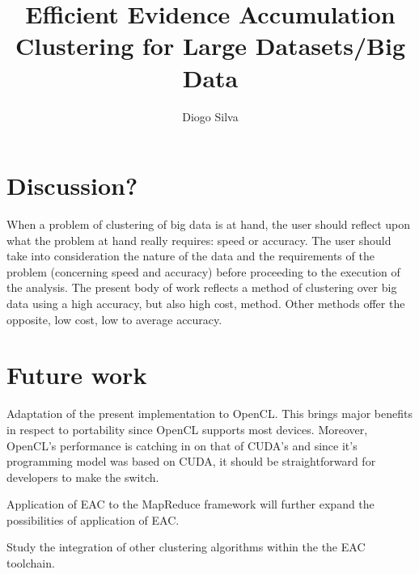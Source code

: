 \documentclass[10pt,a4paper,final]{article}
\author{Diogo Silva}
\title{Efficient Evidence Accumulation Clustering for Large Datasets/Big Data}
\begin{document}
\onehalfspacing %



\tableofcontents

\printglossary[type=\acronymtype,title=Abbreviations]









\section{Discussion?}

When a problem of clustering of big data is at hand, the user should reflect upon what the problem at hand really requires: speed or accuracy. The user should take into consideration the nature of the data and the requirements of the problem (concerning speed and accuracy) before proceeding to the execution of the analysis. The present body of work reflects a method of clustering over big data using a high accuracy, but also high cost, method. Other methods offer the opposite, low cost, low to average accuracy. 

\section{Future work}

Adaptation of the present implementation to OpenCL. This brings major benefits in respect to portability since OpenCL supports most devices. Moreover, OpenCL's performance is catching in on that of CUDA's and since it's programming model was based on CUDA, it should be straightforward for developers to make the switch.

Application of EAC to the MapReduce framework will further expand the possibilities of application of EAC.

Study the integration of other clustering algorithms within the the EAC toolchain.





\end{document}
